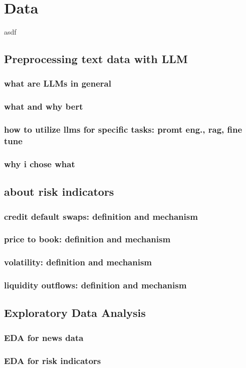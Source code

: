 \chapter{Data}\label{sec2}
\thispagestyle{empty}

asdf

\section{Preprocessing text data with LLM}

\subsection{what are LLMs in general}

\subsection{what and why bert}

\subsection{how to utilize llms for specific tasks: promt eng., rag, fine tune}

\subsection{why i chose what}

\section{about risk indicators}

\subsection{credit default swaps: definition and mechanism}

\subsection{price to book: definition and mechanism}

\subsection{volatility: definition and mechanism}

\subsection{liquidity outflows: definition and mechanism}

\section{Exploratory Data Analysis}

\subsection{EDA for news data}

\subsection{EDA for risk indicators}

\cleardoublepage
